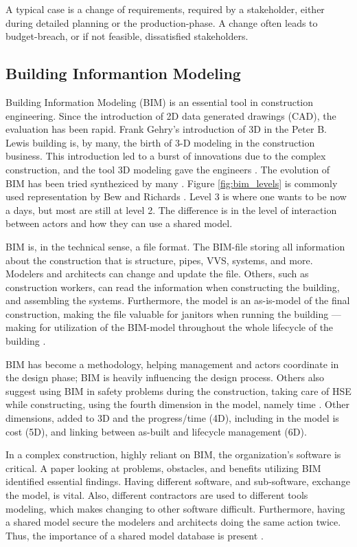 A typical case is a change of requirements, required by a stakeholder, either during detailed planning or the production-phase. A change often leads to budget-breach, or if not feasible, dissatisfied stakeholders. 

\subsection{Building Informantion Modeling} \label{sec:bim}
Building Information Modeling (BIM) is an essential tool in construction engineering. Since the introduction of 2D data generated drawings (CAD), the evaluation has been rapid. Frank Gehry's introduction of 3D in the Peter B. Lewis building is, by many, the birth of 3-D modeling in the construction business. This introduction led to a burst of innovations due to the complex construction, and the tool 3D modeling gave the engineers \cite{frank_gehry}. The evolution of BIM has been tried syntheziced by many \cite{liang2016development}. Figure \ref{fig:bim_levels} is commonly used representation by Bew and Richards \cite{bew2008bim}. Level 3 is where one wants to be now a days, but most are still at level 2. The difference is in the level of interaction between actors and how they can use a shared model.

BIM is, in the technical sense, a file format. The BIM-file storing all information about the construction that is structure, pipes, VVS, systems, and more. Modelers and architects can change and update the file. Others, such as construction workers, can read the information when constructing the building, and assembling the systems. Furthermore, the model is an as-is-model of the final construction, making the file valuable for janitors when running the building — making for utilization of the BIM-model throughout the whole lifecycle of the building \cite{arayici2010building}. 

BIM has become a methodology, helping management and actors coordinate in the design phase; BIM is heavily influencing the design process. Others also suggest using BIM in safety problems during the construction, taking care of HSE while constructing, using the fourth dimension in the model, namely time \cite{zhang2011bim}. Other dimensions, added to 3D and the progress/time (4D), including in the model is cost (5D), and linking between as-built and lifecycle management (6D).

In a complex construction, highly reliant on BIM, the organization's software is critical. A paper \cite{migilinskas2013benefits} looking at problems, obstacles, and benefits utilizing BIM identified essential findings. Having different software, and sub-software, exchange the model, is vital. Also, different contractors are used to different tools modeling, which makes changing to other software difficult. Furthermore, having a shared model secure the modelers and architects doing the same action twice. Thus, the importance of a shared model database is present \cite{lean_i_praksis}. 

